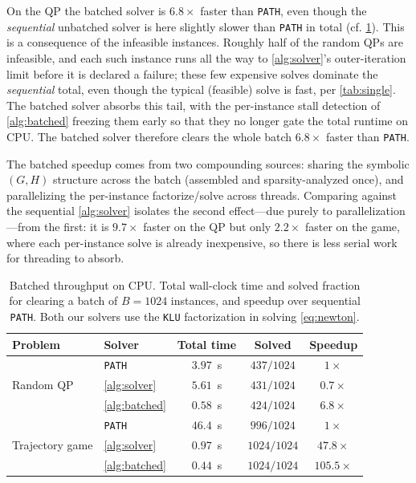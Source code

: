 \documentclass[conference]{IEEEtran}
\begin{document}
On the QP the batched solver is $6.8\times$ faster than \texttt{PATH}, even though the
\emph{sequential} unbatched solver is here slightly slower than \texttt{PATH} in total
(cf. \cref{tab:throughput}). This is a consequence of the infeasible instances. Roughly half of
the random QPs are infeasible, and each such instance runs all the way to
\cref{alg:solver}'s outer-iteration limit before it is declared a failure; these few
expensive solves dominate the \emph{sequential} total, even though the typical (feasible)
solve is fast, per \cref{tab:single}. The batched solver absorbs this tail, with the per-instance stall
detection of \cref{alg:batched} freezing them early so that they no longer gate
the total runtime on CPU. The
batched solver therefore clears the whole batch $6.8\times$ faster than \texttt{PATH}.

The batched speedup comes from two compounding sources: sharing the symbolic
$(G, H)$ structure across the batch (assembled and sparsity-analyzed once), and
parallelizing the per-instance factorize/solve across threads. Comparing against the
sequential \cref{alg:solver} isolates the second effect---due purely to
parallelization---from the first: it is $9.7\times$ faster on the QP but only
$2.2\times$ faster on the
game, where each per-instance solve is already inexpensive, so there is less serial work
for threading to absorb.

\begin{table}[t]
  \centering
  \begin{tabular}{llccc}
    \toprule
    Problem & Solver & Total time & Solved & Speedup \\
    \midrule
    \multirow{3}{*}{Random QP}
      & \texttt{PATH}          & $3.97$~s & $437/1024$ & $1\times$ \\
      & \cref{alg:solver}      & $5.61$~s & $431/1024$ & $0.7\times$ \\
      & \cref{alg:batched}     & $0.58$~s & $424/1024$ & $\mathbf{6.8\times}$ \\
    \midrule
    \multirow{3}{*}{Trajectory game}
      & \texttt{PATH}          & $46.4$~s & $996/1024$ & $1\times$ \\
      & \cref{alg:solver}      & $0.97$~s & $1024/1024$ & $47.8\times$ \\
      & \cref{alg:batched}     & $0.44$~s & $1024/1024$ & $\mathbf{105.5\times}$ \\
    \bottomrule
  \end{tabular}
  \caption{Batched throughput on CPU. Total wall-clock time and solved fraction for clearing a batch
    of $B = 1024$ instances, and speedup over sequential \texttt{PATH}. Both our solvers use
    the \texttt{KLU} factorization in solving \cref{eq:newton}.}
  \label{tab:throughput}
\end{table}
\end{document}
